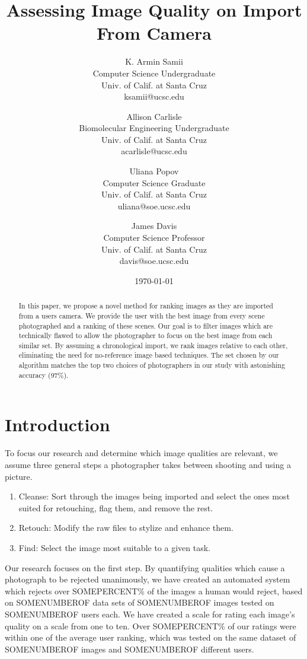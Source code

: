\documentclass[twocolumn]{article}
\title{
   Assessing Image Quality on Import From Camera
} %
\author{
   K. Armin Samii\\
   Computer Science Undergraduate\\
   Univ. of Calif. at Santa Cruz\\
   ksamii@ucsc.edu
  \and
   Allison Carlisle\\
   Biomolecular Engineering Undergraduate\\
   Univ. of Calif. at Santa Cruz\\
   acarlisle@ucsc.edu
  \and
   Uliana Popov\\
   Computer Science Graduate\\
   Univ. of Calif. at Santa Cruz\\
   uliana@soe.ucsc.edu
  \and
   James Davis\\
   Computer Science Professor\\
   Univ. of Calif. at Santa Cruz\\
   davis@soe.ucsc.edu
}
\date{\today}
\begin{document}
\maketitle

\begin{abstract}
In this paper, we propose a novel method for ranking images as they are imported from a users camera. We provide the user with the best image from every scene photographed and a ranking of these scenes. Our goal is to filter images which are technically flawed to allow the photographer to focus on the best image from each similar set. By assuming a chronological import, we rank images relative to each other, eliminating the need for no-reference image based techniques. The set chosen by our algorithm matches the top two choices of photographers in our study with astonishing accuracy (97\%).
\end{abstract}
\section{Introduction}
To focus our research and determine which image qualities are relevant, we assume three general steps a photographer takes between shooting and using a picture.
\begin{enumerate}
\item Cleanse: Sort through the images being imported and select the ones most suited for retouching, flag them, and remove the rest.
\item Retouch: Modify the raw files to stylize and enhance them.
\item Find: Select the image most suitable to a given task.
\end{enumerate}
Our research focuses on the first step. By quantifying qualities which cause a photograph to be rejected unanimously, we have created an automated system which rejects over SOMEPERCENT\% of the images a human would reject, based on SOMENUMBEROF data sets of SOMENUMBEROF images tested on SOMENUMBEROF users each. We have created a scale for rating each image's quality on a scale from one to ten. Over SOMEPERCENT\% of our ratings were within one of the average user ranking, which was tested on the same dataset of SOMENUMBEROF images and SOMENUMBEROF different users.
\end{document}
